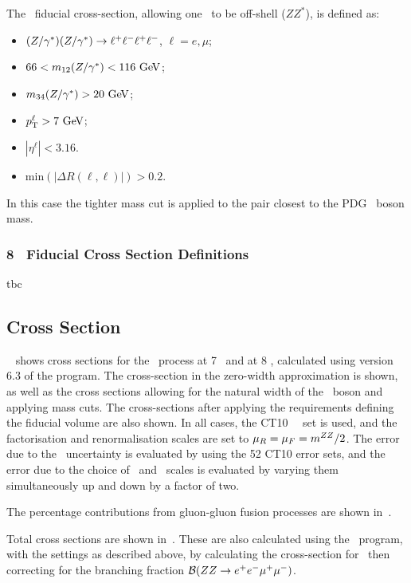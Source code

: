 The \zzllll\ fiducial cross-section, allowing one \Z\ to be off-shell ($ZZ^*$), is defined as:

\begin{itemize}
\item $(Z/\gamma^*)(Z/\gamma^*)\rightarrow\ell^+ \ell^-\ell^+ \ell^-$, $\ell = e,\mu$;
\item $66 < m_{12}(\Z/\gamma^*) <  116\GeV$;
\item $m_{34}(\Z/\gamma^*) > 20\GeV$;
\item $\pT^{\ell} > 7\GeV$;
\item $|\eta^{\ell}| < 3.16$.
\item $\mathrm{min}(|\Delta R(\ell,\ell)|) > 0.2$.
\end{itemize}

In this case the tighter mass cut is applied to the pair closest to the PDG \Z\
boson mass.

\subsubsection{8 \tev\ Fiducial Cross Section Definitions}

tbc

\subsection{Cross Section}

~ shows cross sections for the \ZZeemm\ process at 7 \tev\ and
at 8 \tev, calculated using version 6.3 of the
\mcfm\cite{Campbell:2011} program. The cross-section in the zero-width approximation is shown, as
well as the cross sections allowing for the natural width of the \Z\ boson and
applying mass cuts.  The cross-sections after applying the requirements defining
the fiducial volume are also shown. 
In all cases, the CT10~\cite{CT10} \partDF\ set is used, and the factorisation and renormalisation scales are set
to $\mu_{R} = \mu_{F} = m^{ZZ}/2$. The error due to the \partDF\ uncertainty is
evaluated by using the 52 CT10 error sets, and the error due to the choice of
\fact\ and \renorm\ scales is evaluated by varying them
simultaneously up and down by a factor of two. 

The percentage contributions from
gluon-gluon fusion processes are shown in~\fig{}.

Total cross sections are shown in~. These are also
calculated using the \mcfm\ program, with the settings as described above, by
calculating the cross-section for \ZZeemm\ then correcting for the branching
fraction $\mathcal{B}(ZZ\rightarrow e^{+}e^{-}\mu^{+}\mu^{-})$. 


